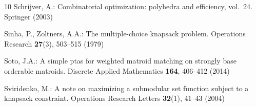 \documentclass[11pt,letter]{article}
\begin{document}
\begin{thebibliography}{10}
Schrijver, A.: Combinatorial optimization: polyhedra and efficiency, vol.~24.
  Springer (2003)

Sinha, P., Zoltners, A.A.: The multiple-choice knapsack problem. Operations
  Research  \textbf{27}(3),  503--515 (1979)

Soto, J.A.: A simple ptas for weighted matroid matching on strongly base
  orderable matroids. Discrete Applied Mathematics  \textbf{164},  406--412
  (2014)

Sviridenko, M.: A note on maximizing a submodular set function subject to a
  knapsack constraint. Operations Research Letters  \textbf{32}(1),  41--43
  (2004)

\end{thebibliography}
		\appendix
		
	
\end{document}
